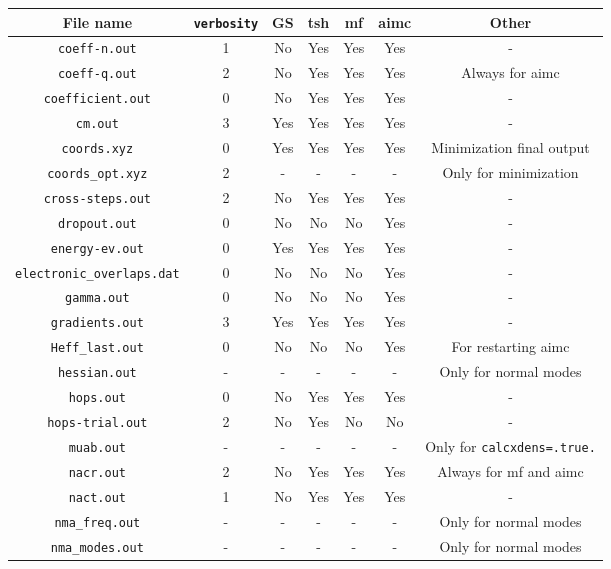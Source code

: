 \begin{center}
\begin{table}
\begin{tabular}{|c|c|c|c|c|c|c|}
	\hline
	File name & \verb+verbosity+ & GS & tsh & mf & aimc & Other\\
	\hline
	\hline
	\verb+coeff-n.out+ & 1 & No & Yes & Yes & Yes & - \\
	\hline
	\verb+coeff-q.out+ & 2 & No & Yes & Yes & Yes & Always for aimc \\
	\hline
	\verb+coefficient.out+ & 0 & No & Yes & Yes & Yes & - \\
	\hline
	\verb+cm.out+ & 3 & Yes & Yes & Yes & Yes & - \\
	\hline
	\verb+coords.xyz+ & 0 & Yes & Yes & Yes & Yes & Minimization final output \\
	\hline
        \verb+coords_opt.xyz+ & 2 & - & - & - & - & Only for minimization \\
        \hline
	\verb+cross-steps.out+ & 2 & No & Yes & Yes & Yes & - \\
	\hline
	\verb+dropout.out+ & 0 & No & No & No & Yes & - \\
	\hline
	\verb+energy-ev.out+ & 0 & Yes & Yes & Yes & Yes & - \\
	\hline
	\verb+electronic_overlaps.dat+ & 0 & No & No & No & Yes & - \\
	\hline
	\verb+gamma.out+ & 0 & No & No & No & Yes & - \\
	\hline
	\verb+gradients.out+ & 3 & Yes & Yes & Yes & Yes& -\\
	\hline
	\verb+Heff_last.out+ & 0 & No & No & No & Yes & For restarting aimc \\
	\hline
	\verb+hessian.out+ & - & - & - & - & - & Only for normal modes \\
	\hline
	\verb+hops.out+ & 0 & No & Yes & Yes & Yes & - \\
	\hline
	\verb+hops-trial.out+ & 2 & No & Yes & No & No & - \\
	\hline
	\verb+muab.out+ & - & - & - & - & - & Only for \verb+calcxdens=.true.+ \\
	\hline
	\verb+nacr.out+ & 2 & No & Yes & Yes & Yes & Always for mf and aimc \\
	\hline
	\verb+nact.out+ & 1 & No & Yes & Yes & Yes & - \\
	\hline
	\verb+nma_freq.out+ & - & - & - & - & - & Only for normal modes \\
	\hline
	\verb+nma_modes.out+ & - & - & - & - & - & Only for normal modes \\

\end{tabular}
\end{table}
\end{center}
